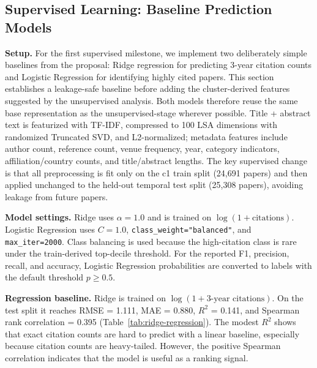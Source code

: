 
\subsection{Supervised Learning: Baseline Prediction Models}

\textbf{Setup.} For the first supervised milestone, we implement two
deliberately simple baselines from the proposal: Ridge regression for
predicting 3-year citation counts and Logistic Regression for identifying
highly cited papers. This section establishes a leakage-safe baseline before
adding the cluster-derived features suggested by the unsupervised analysis.
Both models therefore reuse the same base representation as the
unsupervised-stage wherever possible. Title + abstract text is featurized
with TF-IDF, compressed to 100 LSA dimensions with randomized Truncated SVD,
and L2-normalized; metadata features include author count, reference count,
venue frequency, year, category indicators, affiliation/country counts, and
title/abstract lengths. The key supervised change is that all preprocessing
is fit only on the c1 train split (24{,}691 papers) and then applied unchanged
to the held-out temporal test split (25{,}308 papers), avoiding leakage from
future papers.

\textbf{Model settings.} Ridge uses $\alpha{=}1.0$ and is trained on
$\log(1+\text{citations})$. Logistic Regression uses $C{=}1.0$,
\texttt{class\_weight="balanced"}, and \texttt{max\_iter=2000}. Class
balancing is used because the high-citation class is rare under the
train-derived top-decile threshold. For the reported F1, precision, recall,
and accuracy, Logistic Regression probabilities are converted to labels with
the default threshold $p \ge 0.5$.

\textbf{Regression baseline.} Ridge is trained on
$\log(1+\text{3-year citations})$. On the test split it reaches RMSE =
1.111, MAE = 0.880, $R^2$ = 0.141, and Spearman rank correlation = 0.395
(Table~\ref{tab:ridge-regression}). The modest $R^2$ shows that exact
citation counts are hard to predict with a linear baseline, especially
because citation counts are heavy-tailed. However, the positive Spearman
correlation indicates that the model is useful as a ranking signal.

